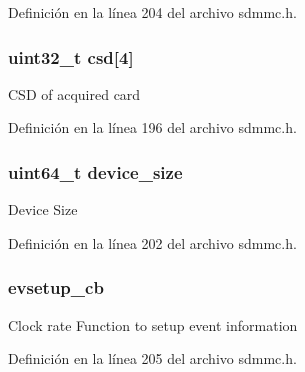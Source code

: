 Definición en la línea 204 del archivo sdmmc.\+h.

\subsubsection[{\texorpdfstring{csd}{csd}}]{\setlength{\rightskip}{0pt plus 5cm}uint32\+\_\+t csd\mbox{[}4\mbox{]}}\hypertarget{struct_s_d_m_m_c___c_a_r_d___t_a19d36c084d93f976533cb7f3747617a7}{}\label{struct_s_d_m_m_c___c_a_r_d___t_a19d36c084d93f976533cb7f3747617a7}
C\+SD of acquired card 

Definición en la línea 196 del archivo sdmmc.\+h.

\subsubsection[{\texorpdfstring{device\+\_\+size}{device_size}}]{\setlength{\rightskip}{0pt plus 5cm}uint64\+\_\+t device\+\_\+size}\hypertarget{struct_s_d_m_m_c___c_a_r_d___t_a316beaaf7640003a2c28fbfa5fc222dd}{}\label{struct_s_d_m_m_c___c_a_r_d___t_a316beaaf7640003a2c28fbfa5fc222dd}
Device Size 

Definición en la línea 202 del archivo sdmmc.\+h.

\subsubsection[{\texorpdfstring{evsetup\+\_\+cb}{evsetup_cb}}]{ evsetup\+\_\+cb}\hypertarget{struct_s_d_m_m_c___c_a_r_d___t_a863f41c39cc6b5316fa1ae19f30116a8}{}\label{struct_s_d_m_m_c___c_a_r_d___t_a863f41c39cc6b5316fa1ae19f30116a8}
Clock rate Function to setup event information 

Definición en la línea 205 del archivo sdmmc.\+h.

